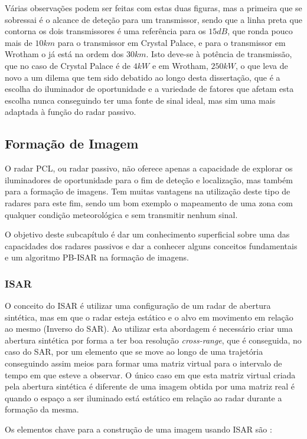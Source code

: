 Várias observações podem ser feitas com estas duas figuras, mas a primeira que se sobressai é o alcance de deteção para um transmissor, sendo que a linha preta que contorna os dois transmissores é uma referência para os $15dB$, que ronda pouco mais de $10km$ para o transmissor em Crystal Palace, e para o transmissor em Wrotham o já está na ordem dos $30km$. Isto deve-se à potência de transmissão, que no caso de Crystal Palace é de $4kW$ e em Wrotham, $250kW$, o que leva de novo a um dilema que tem sido debatido ao longo desta dissertação, que é a escolha do iluminador de oportunidade e a variedade de fatores que afetam esta escolha nunca conseguindo ter uma fonte de sinal ideal, mas sim uma mais adaptada à função do radar passivo.


\subsection{Formação de Imagem}
O radar \gls{PCL}, ou radar passivo, não oferece apenas a capacidade de explorar os iluminadores de oportunidade para o fim de deteção e localização, mas também para a formação de imagens. Tem muitas vantagens na utilização deste tipo de radares para este fim, sendo um bom exemplo o mapeamento de uma zona com qualquer condição meteorológica e sem transmitir nenhum sinal.\par 
O objetivo deste subcapítulo é dar um conhecimento superficial sobre uma das capacidades dos radares passivos e dar a conhecer alguns conceitos fundamentais e um algoritmo \gls{PB-ISAR} na formação de imagens.\par 

\subsubsection*{\gls{ISAR}}
O conceito do \gls{ISAR} é utilizar uma configuração de um radar de abertura sintética, mas em que o radar esteja estático e o alvo em movimento em relação ao mesmo (Inverso do \gls{SAR}). Ao utilizar esta abordagem é necessário criar uma abertura sintética por forma a ter boa resolução \textit{cross-range}, que é conseguida, no caso do \gls{SAR}, por um elemento que se move ao longo de uma trajetória conseguindo assim meios para formar uma matriz virtual para o intervalo de tempo em que esteve a observar. O único caso em que esta matriz virtual criada pela abertura sintética é diferente de uma imagem obtida por uma matriz real é quando o espaço a ser iluminado está estático em relação ao radar durante a formação da mesma.\par 
Os elementos chave para a construção de uma imagem usando \gls{ISAR} são \parencite{Martorella2019}:

